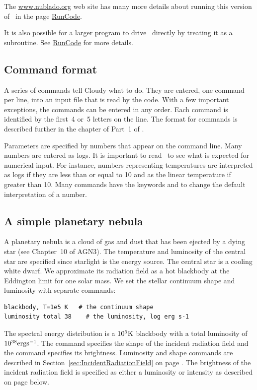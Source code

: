 \documentclass[12pt,twoside]{article}
\begin{document}
The \href{http://www.nublado.org}{www.nublado.org} web site has many more details
about running this version of \Cloudy\ in the page
\href{http://trac.nublado.org/wiki/RunCode}{RunCode}.

It is also possible for a larger program to drive \Cloudy\ directly by
treating it as a subroutine. 
See \href{http://trac.nublado.org/wiki/RunCode}{RunCode} for more details.

\subsection{Command format}

A series of commands tell Cloudy what to do.
They are entered, one command per line,
into an input file that is read by the code.
With a few important
exceptions, the commands can be entered in any order.
Each command is
identified by the first~4 or~5 letters on the line.
The format for commands is described further in the
chapter  of Part~1 of \Hazy.

Parameters are specified by numbers that appear on the command line.
Many numbers are entered as logs.
It is important to read \Hazy\ to see what is
expected for numerical input.
For instance, numbers representing
temperatures are interpreted as logs if they are
less than or equal to 10 and as the linear
temperature if greater than 10.
Many commands have the keywords  and
 to change the default interpretation of a number.

\subsection{A simple planetary nebula}

A planetary nebula is a cloud of gas and dust that has been ejected by
a dying star (see Chapter~10 of AGN3).  The temperature and luminosity of
the central star are specified since starlight is the energy source.  The
central star is a cooling white dwarf.
We approximate its radiation field as a hot blackbody
at the Eddington limit for one solar mass.  We set the stellar continuum
shape and luminosity with separate commands:
\small
\begin{verbatim}
blackbody, T=1e5 K   # the continuum shape
luminosity total 38    # the luminosity, log erg s-1
\end{verbatim}
\normalsize
The spectral energy distribution is a $10^5 \rm{K}$ blackbody
with a total luminosity of $10^{38} \rm{erg s^{-1}}$.
The  command specifies the shape of the incident
radiation field and the  command
specifies its brightness.
Luminosity and shape commands are described in Section~\ref{sec:IncidentRadiationField}
on page \pageref{sec:IncidentRadiationField}.
The brightness of the incident radiation field is specified
as either a luminosity or intensity as described on
page \pageref{sec:LuminosityVsIntensityCases} below.
\end{document}
